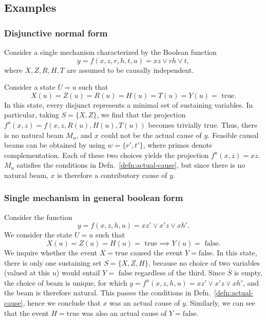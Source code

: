 \documentclass[11pt]{article}
\numberwithin{equation}{section}
\begin{document}
\subsection{Examples}
\subsubsection{Disjunctive normal form}
Consider a single mechanism characterized by the Boolean function
\begin{equation}
y = f(x,z,r,h,t,u) = xz \vee rh \vee t, \nonumber
\end{equation}
where $X,Z,R,H,T$ are assumed to be causally independent. 

Consider a state $U=u$ such that
\begin{equation}
X(u)=Z(u)=R(u)=H(u)=T(u)=Y(u)=\text{ true}. \nonumber
\end{equation}
In this state, every disjunct represents a minimal set of sustaining variables. In particular, taking $S=\{X,Z\}$, we find that the projection $f^u(x,z)=f(x,z, R(u), H(u), T(u))$ becomes trivially true. Thus, there is no natural beam $M_u$, and $x$ could not be the actual cause of $y$. Feasible causal beams can be obtained by using $w=\{r', t'\}$, where primes denote complementation. Each of these two choices yields the projection $f^u(x,z) = xz$. $M_u$ satisfies the conditions in Defn.~\ref{defn:actual-cause}, but since there is no natural beam, $x$ is therefore a contributory cause of $y$.

\subsubsection{Single mechanism in general boolean form}

Consider the function
\begin{equation}
y=f(x,z,h,u) = xz' \vee x'z \vee xh'.
\end{equation}
We consider the state $U=u$ such that
\begin{equation}
X(u)=Z(u)=H(u)=\text{ true} \implies Y(u)=\text{ false}. \nonumber
\end{equation}
We inquire whether the event $X = \text{true}$ caused the event $Y = \text{false}$. In this state, there is only one sustaining set $S=\{X,Z,H\}$, because no choice of two variables (valued at this $u$) would entail $Y=\text{ false}$ regardless of the third. Since $\bar{S}$ is empty, the choice of beam is unique, for which $y=f^u(x,z,h,u) = xz' \vee x'z \vee xh'$, and the beam is therefore natural. This passes the conditions in Defn.~\ref{defn:actual-cause}, hence we conclude that $x$ was an actual cause of $y$. Similarly, we can see that the event $H= \text{true}$ was also an actual cause of $Y= \text{false}$. 
\end{document}
